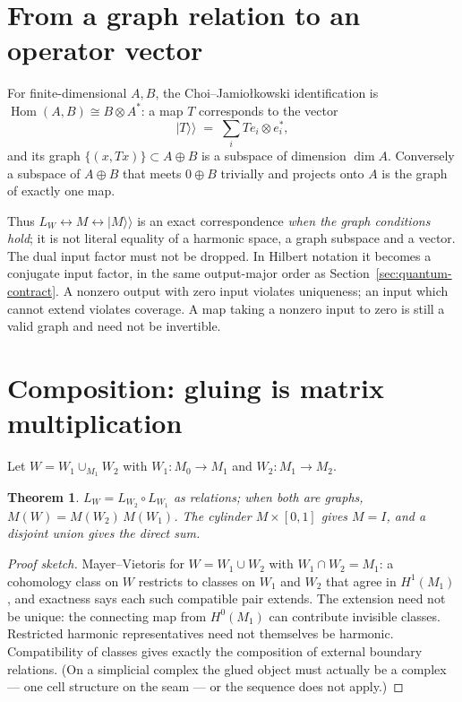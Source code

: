 \documentclass[11pt]{article}
\newtheorem{theorem}{Theorem}[section]
\theoremstyle{definition}
\theoremstyle{remark}
\DeclareMathOperator{\Hom}{Hom}
\begin{document}
\section{From a graph relation to an operator vector}\label{sec:choi}

For finite-dimensional $A, B$, the Choi--Jamio\l{}kowski identification is
$\Hom(A,B) \cong B\otimes A^*$: a map $T$ corresponds to the vector
\[
  |T\rangle\!\rangle \;=\; \sum_i T e_i \otimes e_i^* ,
\]
and its graph $\{(x, Tx)\} \subset A \oplus B$ is a subspace of dimension
$\dim A$. Conversely a subspace of $A\oplus B$ that meets $0 \oplus B$
trivially and projects onto $A$ is the graph of exactly one map.

Thus $L_W\leftrightarrow M\leftrightarrow |M\rangle\!\rangle$ is an exact
correspondence \emph{when the graph conditions hold}; it is not literal
equality of a harmonic space, a graph subspace and a vector. The dual input
factor must not be dropped. In Hilbert notation it becomes a conjugate
input factor, in the same output-major order as
Section~\ref{sec:quantum-contract}.
A nonzero output with zero input violates uniqueness; an input which cannot
extend violates coverage. A map taking a nonzero input to zero is still a
valid graph and need not be invertible.

\section{Composition: gluing is matrix multiplication}\label{sec:composition}

Let $W = W_1 \cup_{M_1} W_2$ with $W_1: M_0 \to M_1$ and $W_2: M_1 \to M_2$.

\begin{theorem}\label{thm:compose}
$L_W = L_{W_2} \circ L_{W_1}$ as relations; when both are graphs,
$M(W) = M(W_2)\,M(W_1)$. The cylinder $M\times[0,1]$ gives $M = I$, and a
disjoint union gives the direct sum.
\end{theorem}
\begin{proof}[Proof sketch]
Mayer--Vietoris for $W = W_1 \cup W_2$ with $W_1 \cap W_2 = M_1$: a
cohomology class on $W$ restricts to classes on $W_1$ and $W_2$ that
agree in $H^1(M_1)$, and exactness says each such compatible pair extends.
The extension need not be unique: the connecting map from $H^0(M_1)$
can contribute invisible classes. Restricted harmonic representatives
need not themselves be harmonic. Compatibility of classes gives exactly
the composition of external boundary relations. (On a simplicial complex the
glued object must actually be a complex --- one cell structure on the seam
--- or the sequence does not apply.)
\end{proof}
\end{document}
